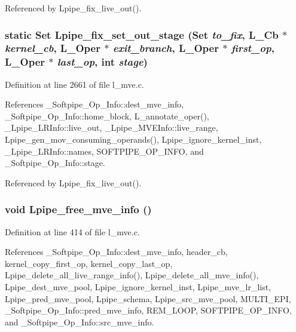 Referenced by Lpipe\_\-fix\_\-live\_\-out().
\subsubsection{\setlength{\rightskip}{0pt plus 5cm}static Set Lpipe\_\-fix\_\-set\_\-out\_\-stage (Set {\em to\_\-fix}, L\_\-Cb $\ast$ {\em kernel\_\-cb}, L\_\-Oper $\ast$ {\em exit\_\-branch}, L\_\-Oper $\ast$ {\em first\_\-op}, L\_\-Oper $\ast$ {\em last\_\-op}, int {\em stage})\hspace{0.3cm}{\tt  [static]}}\label{l__mve_8c_26ca66a6c5177a42f255a740d1979087}




Definition at line 2661 of file l\_\-mve.c.

References \_\-Softpipe\_\-Op\_\-Info::dest\_\-mve\_\-info, \_\-Softpipe\_\-Op\_\-Info::home\_\-block, L\_\-annotate\_\-oper(), \_\-Lpipe\_\-LRInfo::live\_\-out, \_\-Lpipe\_\-MVEInfo::live\_\-range, Lpipe\_\-gen\_\-mov\_\-consuming\_\-operands(), Lpipe\_\-ignore\_\-kernel\_\-inst, \_\-Lpipe\_\-LRInfo::names, SOFTPIPE\_\-OP\_\-INFO, and \_\-Softpipe\_\-Op\_\-Info::stage.

Referenced by Lpipe\_\-fix\_\-live\_\-out().
\subsubsection{\setlength{\rightskip}{0pt plus 5cm}void Lpipe\_\-free\_\-mve\_\-info ()}\label{l__mve_8c_78c3c1d55b2de2cc8d2c30fc73669d6b}




Definition at line 414 of file l\_\-mve.c.

References \_\-Softpipe\_\-Op\_\-Info::dest\_\-mve\_\-info, header\_\-cb, kernel\_\-copy\_\-first\_\-op, kernel\_\-copy\_\-last\_\-op, Lpipe\_\-delete\_\-all\_\-live\_\-range\_\-info(), Lpipe\_\-delete\_\-all\_\-mve\_\-info(), Lpipe\_\-dest\_\-mve\_\-pool, Lpipe\_\-ignore\_\-kernel\_\-inst, Lpipe\_\-mve\_\-lr\_\-list, Lpipe\_\-pred\_\-mve\_\-pool, Lpipe\_\-schema, Lpipe\_\-src\_\-mve\_\-pool, MULTI\_\-EPI, \_\-Softpipe\_\-Op\_\-Info::pred\_\-mve\_\-info, REM\_\-LOOP, SOFTPIPE\_\-OP\_\-INFO, and \_\-Softpipe\_\-Op\_\-Info::src\_\-mve\_\-info.

